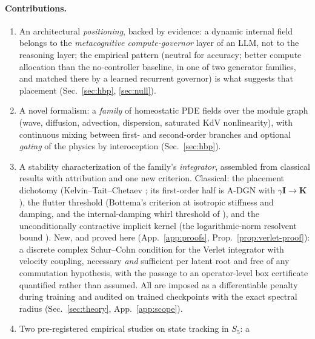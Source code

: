 \documentclass{article}
\begin{document}
\paragraph{Contributions.}
\begin{enumerate}
  \item An architectural \emph{positioning}, backed by evidence: a dynamic
        internal field belongs to the \emph{metacognitive compute-governor}
        layer of an LLM, not to the reasoning layer; the empirical pattern
        (neutral for accuracy; better compute allocation than the
        no-controller baseline, in one of two generator families, and matched
        there by a learned recurrent governor) is what suggests that
        placement (Sec.~\ref{sec:hbp}, \ref{sec:null}).
  \item A novel formalism: a \emph{family} of homeostatic PDE fields over the
        module graph (wave, diffusion, advection, dispersion, saturated KdV
        nonlinearity), with continuous mixing between first- and second-order
        branches and optional \emph{gating} of the physics by interoception
        (Sec.~\ref{sec:hbp}).
  \item A stability characterization of the family's \emph{integrator},
        assembled from classical results with attribution and one new
        criterion. Classical: the placement dichotomy
        (Kelvin--Tait--Chetaev \citep{thomson1879treatise,merkin1997}; its
        first-order half is A-DGN \citep{gravina2023adgn} with
        $\gamma\mathbf{I}\to\mathbf{K}$), the flutter threshold (Bottema's
        criterion \citep{bottema1955stability} at isotropic stiffness and
        damping, and the internal-damping whirl threshold of
        \citet{smith1933motion}), and the unconditionally contractive
        implicit kernel (the logarithmic-norm resolvent bound
        \citep{dahlquist1958stability,soderlind2006logarithmic,bai2003hermitian}).
        New, and proved here (App.~\ref{app:proofs},
        Prop.~\ref{prop:verlet-proof}): a discrete complex Schur--Cohn
        condition for the Verlet integrator with velocity coupling, necessary
        \emph{and} sufficient per latent root and free of any commutation
        hypothesis, with the passage to an operator-level box certificate
        quantified rather than assumed. All are imposed as a
        differentiable penalty during training and audited on trained
        checkpoints with the exact spectral radius
        (Sec.~\ref{sec:theory}, App.~\ref{app:scope}).
  \item Two pre-registered empirical studies on state tracking in $S_5$: a

\end{enumerate}
\end{document}
